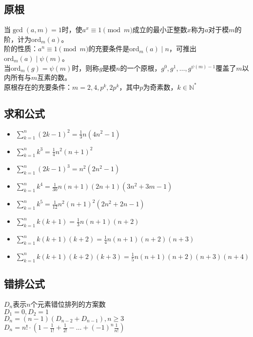 	\subsection*{原根}
		当$ \gcd(a, m) = 1 $时，使$ a^x \equiv 1 \pmod m $成立的最小正整数$ x $称为$ a $对于模$ m $的阶，计为$ \text{ord}_m(a) $。
		\\阶的性质：$ a^n \equiv 1 \pmod m $的充要条件是$ \text{ord}_m(a) \mid n $，可推出$ \text{ord}_m(a) \mid \psi(m) $。
		\\当$ \text{ord}_m(g) = \psi(m) $时，则称$ g $是模$ n $的一个原根，$ g^0, g^1, \dots, g^{\psi(m) - 1} $覆盖了$ m $以内所有与$ m $互素的数。
		\\原根存在的充要条件：$ m = 2, 4, p^k, 2 p^k $，其中$ p $为奇素数，$ k \in \mathbb{N}^\ast $
	\subsection*{求和公式}
		\begin{itemize}[nosep,wide=0pt]
			\item $ \sum\limits_{k=1}^{n} (2k - 1)^2 = \frac{1}{3} n(4n^2 - 1) $
			\item $ \sum\limits_{k=1}^{n} k^3 = \frac{1}{4} n^2(n + 1)^2 $
			\item $ \sum\limits_{k=1}^{n} (2k - 1)^3 = n^2(2n^2 - 1) $
			\item $ \sum\limits_{k=1}^{n} k^4 = \frac{1}{30} n(n + 1) (2n + 1) (3n^2 + 3m - 1) $
			\item $ \sum\limits_{k=1}^{n} k^5 = \frac{1}{12} n^2(n + 1)^2(2n^2 + 2n - 1) $
			\item $ \sum\limits_{k=1}^{n} k(k + 1) = \frac{1}{3} n(n + 1)(n + 2) $
			\item $ \sum\limits_{k=1}^{n} k(k + 1)(k + 2) = \frac{1}{4} n(n + 1)(n + 2)(n + 3) $
			\item $ \sum\limits_{k=1}^{n} k(k + 1)(k + 2)(k + 3) = \frac{1}{5} n(n + 1)(n + 2)(n + 3)(n + 4) $
		\end{itemize}
	\subsection*{错排公式}
		$ D_n $表示$ n $个元素错位排列的方案数
		\\$ D_1 = 0, D_2 = 1 $
		\\$ D_n = (n - 1)(D_{n - 2} + D_{n - 1}), n \geq 3 $
		\\$ D_n = n! \cdot (1 - \frac{1}{1!} + \frac{1}{2!} - \dots + (-1)^n\frac{1}{n!}) $
